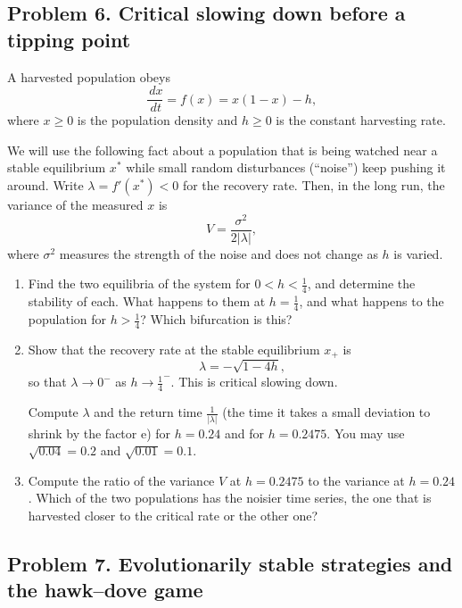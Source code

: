 \documentclass[a4paper,12pt]{article}
\newcommand{\dd}{\,d}
\begin{document}
\subsection*{Problem 6. Critical slowing down before a tipping point}

A harvested population obeys
\[ \frac{\dd x}{\dd t} = f(x) = x\left( 1-x \right) - h, \]
where $x \geq 0$ is the population density and $h \geq 0$ is the constant harvesting rate.

We will use the following fact about a population that is being watched near a stable equilibrium $x^*$ while small random disturbances (``noise'') keep pushing it around. Write $\lambda = f'(x^*) < 0$ for the recovery rate. Then, in the long run, the variance of the measured $x$ is
\[ V = \frac{\sigma^2}{2\left| \lambda \right|} , \]
where $\sigma^2$ measures the strength of the noise and does not change as $h$ is varied.

\begin{enumerate}[label=(\alph*)]
\item Find the two equilibria of the system for $0<h<\frac{1}{4}$, and determine the stability of each. What happens to them at $h=\frac{1}{4}$, and what happens to the population for $h>\frac{1}{4}$? Which bifurcation is this?

\item Show that the recovery rate at the stable equilibrium $x_+$ is
\[ \lambda = -\sqrt{1-4h} , \]
so that $\lambda \to 0^-$ as $h \to \frac{1}{4}^-$. This is critical slowing down.

Compute $\lambda$ and the return time $\frac{1}{\left| \lambda \right|}$ (the time it takes a small deviation to shrink by the factor $\text{e}$) for $h=0.24$ and for $h=0.2475$. You may use $\sqrt{0.04}=0.2$ and $\sqrt{0.01}=0.1$.

\item Compute the ratio of the variance $V$ at $h=0.2475$ to the variance at $h=0.24$. Which of the two populations has the noisier time series, the one that is harvested closer to the critical rate or the other one?
\end{enumerate}

\subsection*{Problem 7. Evolutionarily stable strategies and the hawk--dove game}
\end{document}
